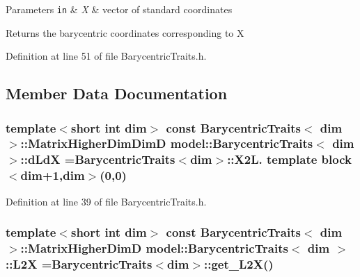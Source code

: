 \begin{DoxyParams}[1]{Parameters}
\mbox{\tt in}  & {\em X} & vector of standard coordinates \\
\hline
\end{DoxyParams}
\begin{DoxyReturn}{Returns}
the barycentric coordinates corresponding to X
\end{DoxyReturn}


Definition at line 51 of file Barycentric\+Traits.\+h.



\subsection{Member Data Documentation}
\hypertarget{structmodel_1_1_barycentric_traits_a06b0741d3bc86d30dd13e92250e86fc2}{}
\subsubsection[{d\+Ld\+X}]{\setlength{\rightskip}{0pt plus 5cm}template$<$short int dim$>$ const {\bf Barycentric\+Traits}$<$ {\bf dim} $>$\+::{\bf Matrix\+Higher\+Dim\+Dim\+D} {\bf model\+::\+Barycentric\+Traits}$<$ {\bf dim} $>$\+::d\+Ld\+X ={\bf Barycentric\+Traits}$<${\bf dim}$>$\+::X2\+L. template block$<${\bf dim}+1,{\bf dim}$>$(0,0)\hspace{0.3cm}{\ttfamily [static]}}\label{structmodel_1_1_barycentric_traits_a06b0741d3bc86d30dd13e92250e86fc2}


Definition at line 39 of file Barycentric\+Traits.\+h.

\hypertarget{structmodel_1_1_barycentric_traits_a727288fed435429e007ae74a250f1027}{}
\subsubsection[{L2\+X}]{\setlength{\rightskip}{0pt plus 5cm}template$<$short int dim$>$ const {\bf Barycentric\+Traits}$<$ {\bf dim} $>$\+::{\bf Matrix\+Higher\+Dim\+D} {\bf model\+::\+Barycentric\+Traits}$<$ {\bf dim} $>$\+::L2\+X ={\bf Barycentric\+Traits}$<${\bf dim}$>$\+::get\+\_\+\+L2\+X()\hspace{0.3cm}{\ttfamily [static]}}\label{structmodel_1_1_barycentric_traits_a727288fed435429e007ae74a250f1027}


